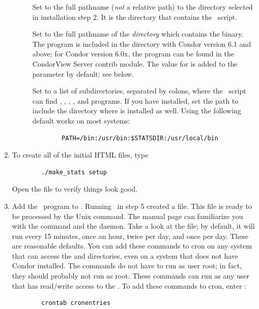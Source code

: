 \begin{enumerate}
\begin{description}
	\item[] Set to the full pathname
	(\emph{not} a relative path) to the  directory selected
	in installation step 2.  
	It is the directory that contains the \MakeStats\ script.

	\item[]  Set to the full
	pathname of the \emph{directory} which contains the 
	binary.
	The  program is included in the 
	directory with Condor version 6.1 and above; for Condor version
	6.0x, the  program can be found in the CondorView
	Server contrib module.  
	The value for  is added to the 
	parameter by default; see below.  

	\item[] Set to a list of subdirectories,
	separated by colons, where the \MakeStats\ script can find
	, , , , and 
	programs.  
	If you have  installed, set the path to
	include the directory where  is installed as well.  Using
	the following default works on most systems:
        \begin{verbatim} 
        PATH=/bin:/usr/bin:$STATSDIR:/usr/local/bin
        \end{verbatim}

        \end{description}

\item To create all of the initial HTML files, type
\begin{verbatim}
        ./make_stats setup  
\end{verbatim}
Open the file  to verify things look good.


\item Add the \MakeStats\ program to .  
Running \MakeStats\ in step 5 created a  file.
This  file is ready to be processed by the Unix
 command.
The  manual page can familiarize you
with
the  command and the  daemon.
Take a look at the
 file; by default, it will run 
 every 15 minutes, 
 once an hour, 
 twice per day, and 
 once per day.
These are reasonable defaults.  
You can add these commands to cron on any
system that can access the  and
 directories,
even on a system that does not have Condor
installed.  The commands do not have to run as user root; in
fact, they should probably not run as root.  These commands can run
as any user that has read/write access to the .
To add these
commands to cron, enter : 
\begin{verbatim} 
        crontab cronentries
\end{verbatim}


\end{enumerate}
